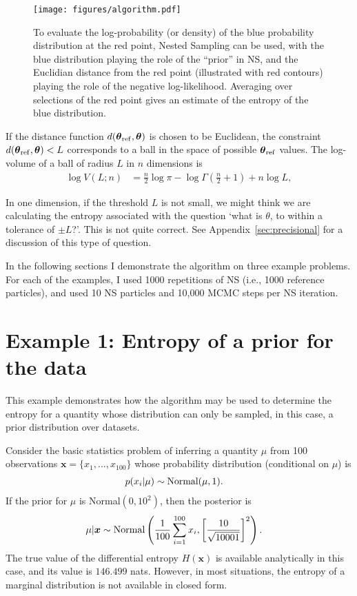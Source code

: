 \documentclass[entropy,article,accept,oneauthor,pdftex,10pt,a4paper]{mdpi}
\newcommand{\x}{\boldsymbol{\theta}}
\newcommand{\xref}{\x_{\rm ref}}
\begin{document}
\begin{figure}[!ht]
\centering
\texttt{[image: figures/algorithm.pdf]}
\caption{To evaluate the log-probability (or density) of the blue
probability distribution at the red point, Nested Sampling can be used,
with the blue distribution playing the role of the ``prior'' in NS, and the
Euclidian distance from the red point (illustrated with red contours)
playing the role of the negative log-likelihood. Averaging over selections
of the red point gives an estimate of the entropy of the blue distribution.
\label{fig:algorithm}}
\end{figure}

If the distance function $d(\xref, \x)$ is chosen to be Euclidean,
the constraint $d(\xref, \x) < L$ corresponds to a ball in the space
of possible $\xref$ values.
The log-volume of a ball of radius $L$ in $n$ dimensions is
\begin{align}
\log V(L; n) &= \frac{n}{2}\log \pi
                        - \log \Gamma\left(\frac{n}{2} + 1\right)
                        + n \log L,
\end{align}

In one dimension,
if the threshold $L$ is not small, we might think we are calculating the entropy associated
with the question `what is $\theta$, to within a tolerance of $\pm L$?'.
This is not quite correct. See Appendix~\ref{sec:precisional}
for a discussion of this
type of question.

In the following sections I demonstrate the algorithm on three
example problems. For each of the examples, I used 1000 repetitions of NS
(i.e., 1000 reference particles), and used 10 NS particles and 10,000 MCMC
steps per NS iteration.

\section{Example 1: Entropy of a prior for the data}

This example demonstrates how the algorithm may be used to determine the
entropy for a quantity whose distribution can only be sampled, in this case,
a prior distribution over datasets.

Consider the basic statistics problem of inferring a quantity $\mu$ from
100 observations $\boldsymbol{x} = \{x_1, ..., x_{100}\}$ whose
probability distribution (conditional on $\mu$) is
\begin{align}
p(x_i | \mu) &\sim \textnormal{Normal}(\mu, 1).
\end{align}
If the prior for $\mu$ is Normal$(0, 10^2)$, then the posterior is
\begin{align}
\mu | \boldsymbol{x} &\sim \textnormal{Normal}\left(
                                       \frac{1}{100}\sum_{i=1}^{100} x_i,
                                       \left[\frac{10}{\sqrt{10001}}\right]^2
                                       \right).
\end{align}
The true value of the differential entropy $H(\boldsymbol{x})$ is
available analytically
in this case, and its value is $146.499$ nats. However, in most situations, the
entropy of a marginal distribution is not available in closed form. 
\end{document}
